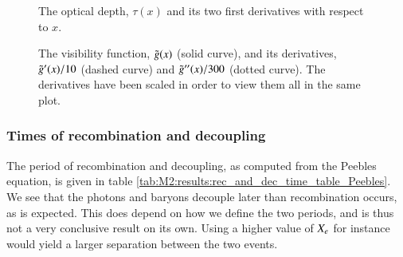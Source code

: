 \begin{figure}[ht!]
    \caption{The optical depth, $\tau(x)$ and its two first derivatives with respect to $x$.}
    \label{fig:M2:results:tau_plot}
\end{figure}


\begin{figure}[ht!]
    \caption{The visibility function, $\tilde{g}(x)$ (solid curve), and its derivatives, $\tilde{g}'(x)/10$ (dashed curve) and $\tilde{g}''(x)/300$ (dotted curve). The derivatives have been scaled in order to view them all in the same plot.}
    \label{fig:M2:results:g_plot}
\end{figure}

\subsubsection{Times of recombination and decoupling} \label{sssec:M2:results:times_of_recombination_and_decoupling}
The period of recombination and decoupling, as computed from the Peebles equation, is given in table \ref{tab:M2:results:rec_and_dec_time_table_Peebles}. We see that the photons and baryons decouple later than recombination occurs, as is expected. This does depend on how we define the two periods, and is thus not a very conclusive result on its own. Using a higher value of $X_e$ for instance would yield a larger separation between the two events.   



  